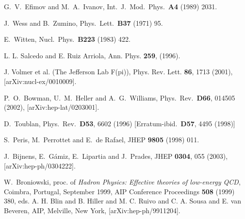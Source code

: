 \begin{thebibliography}{10}
G.~V.~Efimov and M.~A.~Ivanov,
Int.\ J.\ Mod.\ Phys.\ {\bf A4} (1989) 2031.




J.~Wess and B.~Zumino,
Phys.\ Lett.\ {\bf B37} (1971) 95.

E.~Witten,
Nucl.\ Phys.\ {\bf B223} (1983) 422.



 L. L. Salcedo and E. Ruiz Arriola, Ann. Phys. {\bf 259}, (1996).

J. Volmer et al. (The Jefferson Lab F(pi)), Phys. Rev. Lett. {\bf 86}, 1713 (2001), [arXiv:nucl-ex/0010009].  
 
  P.~O.~Bowman, U.~M.~Heller and A.~G.~Williams,
  Phys.\ Rev.\ {\bf D66}, 014505 (2002),
  [arXiv:hep-lat/0203001].




D.~Toublan,
Phys.\ Rev.\ {\bf D53}, 6602 (1996)
[Erratum-ibid.\ {\bf D57}, 4495 (1998)]


S.~Peris, M.~Perrottet and E.~de Rafael,
JHEP {\bf 9805} (1998) 011.



J.~Bijnens, E.~G\'amiz, E.~Lipartia and J.~Prades,
JHEP {\bf 0304}, 055 (2003), [arXiv:hep-ph/0304222].

W.~Broniowski, proc. of {\em Hadron Physics: Effective theories
of low-energy QCD}, Coimbra, Portugal, September 1999, AIP Conference
Proceedings {\bf 508} (1999) 380, eds. A. H. Blin and B. Hiller and M. C.
Ruivo and C. A. Sousa and E. van Beveren, AIP, Melville, New York,
[arXiv:hep-ph/9911204]. %




\end{thebibliography}
